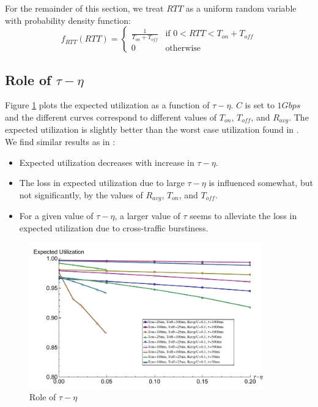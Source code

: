  For the remainder of this section, we treat $RTT$ as a uniform random 
  variable with probability density function:
  \begin{equation}
    f_{RTT}(RTT) =
    \begin{cases}
        \frac{1}{T_{on} + T_{off}} & \text{if } 0 < RTT < T_{on} + T_{off} \\
        0 & \text{otherwise}
    \end{cases}
    \label{rttpdf}
  \end{equation}

  \subsection{Role of $\tau - \eta$}
    Figure \ref{rtttaueta} plots the expected utilization as a function of 
    $\tau - \eta$. $C$ is set to $1Gbps$ and the different curves correspond 
    to different values of $T_{on}$, $T_{off}$, and $R_{avg}$. The expected 
    utilization is slightly better than the worst case utilization found in 
    \cite{Lovewell2011-Noise-TR}. We find similar results as in 
    \cite{Lovewell2011-Noise-TR}:
    \begin{itemize}
      \item Expected utilization  decreases with increase in $\tau - \eta$.
      \item The loss in expected utilization due to large $\tau - \eta$ is 
      influenced somewhat, but not significantly, by the values of $R_{avg}$, 
      $T_{on}$, and $T_{off}$.
      \item For a given value of $\tau - \eta$, a larger value of $\tau$ seems 
      to alleviate the loss in expected utilization due to cross-traffic 
      burstiness.
    \end{itemize}
    \begin{figure}[h]
      \centering
      \includegraphics[width=0.9\textwidth]{img/rtttaueta.pdf}
      \caption{Role of $\tau - \eta$}
      \label{rtttaueta}
    \end{figure}

